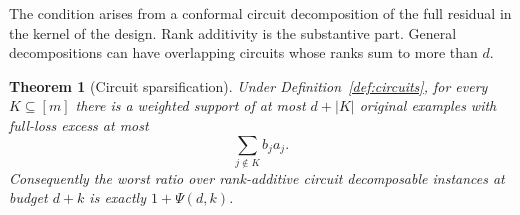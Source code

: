 \documentclass[twoside]{article}
\newtheorem{theorem}{Theorem}
\begin{document}
The condition arises from a conformal circuit decomposition of the full residual in the kernel of the design. Rank additivity is the substantive part. General decompositions can have overlapping circuits whose ranks sum to more than $d$.

\begin{theorem}[Circuit sparsification]
\label{thm:circuits}
Under Definition~\ref{def:circuits}, for every $K\subseteq[m]$ there is a weighted support of at most $d+|K|$ original examples with full-loss excess at most
\begin{equation}
 \sum_{j\notin K}b_ja_j.
 \label{eq:circuit-bound}
\end{equation}
Consequently the worst ratio over rank-additive circuit decomposable instances at budget $d+k$ is exactly $1+\Psi(d,k)$.
\end{theorem}
\end{document}
